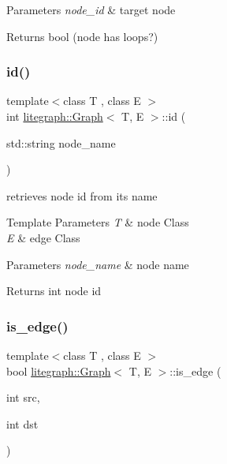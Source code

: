 \begin{DoxyParams}{Parameters}
{\em node\+\_\+id} & target node\\
\hline
\end{DoxyParams}
\begin{DoxyReturn}{Returns}
bool (node has loops?) 
\end{DoxyReturn}
\mbox{\label{classlitegraph_1_1Graph_a74f404758d946ef99d0fa803ce98ee40}} 
\subsubsection{\texorpdfstring{id()}{id()}}
{\footnotesize\ttfamily template$<$class T , class E $>$ \\
int \hyperlink{classlitegraph_1_1Graph}{litegraph\+::\+Graph}$<$ T, E $>$\+::id (\begin{DoxyParamCaption}\item[{std\+::string}]{node\+\_\+name }\end{DoxyParamCaption})}



retrieves node id from its name 


\begin{DoxyTemplParams}{Template Parameters}
{\em T} & node Class \\
\hline
{\em E} & edge Class \\
\hline
\end{DoxyTemplParams}

\begin{DoxyParams}{Parameters}
{\em node\+\_\+name} & node name\\
\hline
\end{DoxyParams}
\begin{DoxyReturn}{Returns}
int node id 
\end{DoxyReturn}
\mbox{\label{classlitegraph_1_1Graph_ab45a134fd4a850085e7e709bb3e91764}} 
\subsubsection{\texorpdfstring{is\+\_\+edge()}{is\_edge()}}
{\footnotesize\ttfamily template$<$class T , class E $>$ \\
bool \hyperlink{classlitegraph_1_1Graph}{litegraph\+::\+Graph}$<$ T, E $>$\+::is\+\_\+edge (\begin{DoxyParamCaption}\item[{int}]{src,  }\item[{int}]{dst }\end{DoxyParamCaption})}



